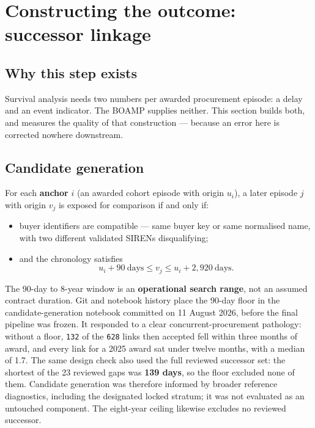 \section{Constructing the outcome: successor linkage}

\subsection{Why this step exists}

Survival analysis needs two numbers per awarded procurement episode: a delay and an event indicator. The BOAMP supplies neither. This section builds both, and measures the quality of that construction --- because an error here is corrected nowhere downstream.

\subsection{Candidate generation}

For each \textbf{anchor} \(i\) (an awarded cohort episode with origin \(u_i\)), a later episode \(j\) with origin \(v_j\) is exposed for comparison if and only if:

\begin{itemize}
\tightlist
\item
  buyer identifiers are compatible --- same buyer key or same normalised name, with two different validated SIRENs disqualifying;
\item
  and the chronology satisfies
  \[u_i + 90\ \text{days} \le v_j \le u_i + 2{,}920\ \text{days}.\]
\end{itemize}

The 90-day to 8-year window is an \textbf{operational search range}, not an assumed contract duration. Git and notebook history place the 90-day floor in the candidate-generation notebook committed on 11 August 2026, before the final pipeline was frozen. It responded to a clear concurrent-procurement pathology: without a floor, \texttt{132} of the \texttt{628} links then accepted fell within three months of award, and every link for a 2025 award sat under twelve months, with a median of 1.7. The same design check also used the full reviewed successor set: the shortest of the 23 reviewed gaps was \textbf{139 days}, so the floor excluded none of them. Candidate generation was therefore informed by broader reference diagnostics, including the designated locked stratum; it was not evaluated as an untouched component. The eight-year ceiling likewise excludes no reviewed successor.

